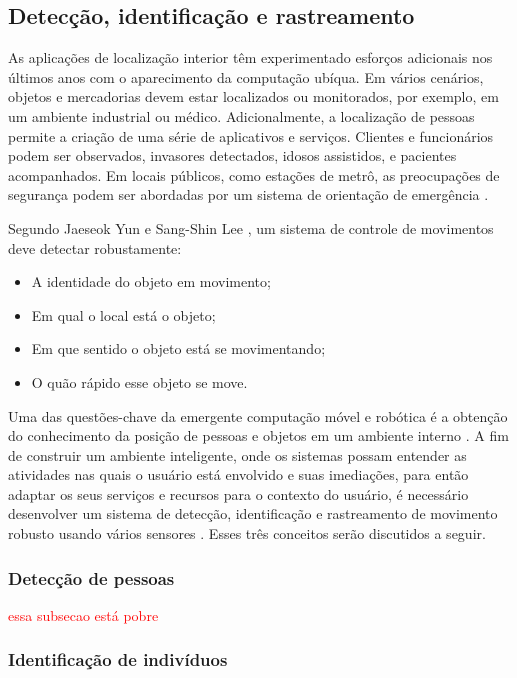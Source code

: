 \subsection{Detecção, identificação e rastreamento}\label{sec:deteccao-rastreamento}

As aplicações de localização interior têm experimentado esforços adicionais nos últimos anos com o aparecimento da computação ubíqua. Em vários cenários, objetos e mercadorias devem estar localizados ou monitorados, por exemplo, em um ambiente industrial ou médico. Adicionalmente, a localização de pessoas permite a criação de uma série de aplicativos e serviços. Clientes e funcionários podem ser observados, invasores detectados, idosos assistidos, e pacientes acompanhados. Em locais públicos, como estações de metrô, as preocupações de segurança podem ser abordadas por um sistema de orientação de emergência \cite{linde2006aspects}. 

Segundo Jaeseok Yun e Sang-Shin Lee \cite{yun2014human}, um sistema de controle de movimentos deve detectar robustamente: 
\begin{itemize}
  \item A identidade do objeto em movimento;
  \item Em qual o local está o objeto; 
  \item Em que sentido o objeto está se movimentando;
  \item O quão rápido esse objeto se move. 
 \end{itemize}

Uma das questões-chave da emergente computação móvel e robótica é a obtenção do conhecimento da posição de pessoas e objetos em um ambiente interno \cite{linde2006aspects}. A fim de construir um ambiente inteligente, onde os sistemas possam entender as atividades nas quais o usuário está envolvido e suas imediações, para então adaptar os seus serviços e recursos para o contexto do usuário, é necessário desenvolver um sistema de detecção, identificação e rastreamento de movimento robusto usando vários sensores \cite{yun2014human}. Esses três conceitos serão discutidos a seguir.


\subsubsection{Detecção de pessoas}\label{sec:deteccao-movimento}
 
 \textcolor{red}{essa subsecao está pobre}
 
\subsubsection{Identificação de indivíduos}\label{sec:identificacao-pessoas}

